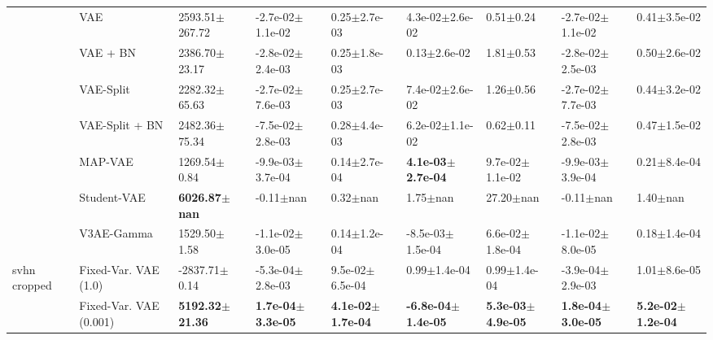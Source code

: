 \begin{tabular}{lllllllll}
             & VAE &          2593.51$\pm$267.72 &          -2.7e-02$\pm$1.1e-02 &              0.25$\pm$2.7e-03 &            4.3e-02$\pm$2.6e-02 &                 0.51$\pm$0.24 &          -2.7e-02$\pm$1.1e-02 &              0.41$\pm$3.5e-02 \\
             & VAE + BN &           2386.70$\pm$23.17 &          -2.8e-02$\pm$2.4e-03 &              0.25$\pm$1.8e-03 &               0.13$\pm$2.6e-02 &                 1.81$\pm$0.53 &          -2.8e-02$\pm$2.5e-03 &              0.50$\pm$2.6e-02 \\
             & VAE-Split &           2282.32$\pm$65.63 &          -2.7e-02$\pm$7.6e-03 &              0.25$\pm$2.7e-03 &            7.4e-02$\pm$2.6e-02 &                 1.26$\pm$0.56 &          -2.7e-02$\pm$7.7e-03 &              0.44$\pm$3.2e-02 \\
             & VAE-Split + BN &           2482.36$\pm$75.34 &          -7.5e-02$\pm$2.8e-03 &              0.28$\pm$4.4e-03 &            6.2e-02$\pm$1.1e-02 &                 0.62$\pm$0.11 &          -7.5e-02$\pm$2.8e-03 &              0.47$\pm$1.5e-02 \\
             & MAP-VAE &            1269.54$\pm$0.84 &          -9.9e-03$\pm$3.7e-04 &              0.14$\pm$2.7e-04 &   \textbf{4.1e-03$\pm$2.7e-04} &           9.7e-02$\pm$1.1e-02 &          -9.9e-03$\pm$3.9e-04 &              0.21$\pm$8.4e-04 \\
             & Student-VAE &    \textbf{6026.87$\pm$nan} &                 -0.11$\pm$nan &                  0.32$\pm$nan &                   1.75$\pm$nan &                 27.20$\pm$nan &                 -0.11$\pm$nan &                  1.40$\pm$nan \\
             & V3AE-Gamma &            1529.50$\pm$1.58 &          -1.1e-02$\pm$3.0e-05 &              0.14$\pm$1.2e-04 &           -8.5e-03$\pm$1.5e-04 &           6.6e-02$\pm$1.8e-04 &          -1.1e-02$\pm$8.0e-05 &              0.18$\pm$1.4e-04 \\
svhn cropped & Fixed-Var. VAE (1.0) &           -2837.71$\pm$0.14 &          -5.3e-04$\pm$2.8e-03 &           9.5e-02$\pm$6.5e-04 &               0.99$\pm$1.4e-04 &              0.99$\pm$1.4e-04 &          -3.9e-04$\pm$2.9e-03 &              1.01$\pm$8.6e-05 \\
             & Fixed-Var. VAE (0.001) &  \textbf{5192.32$\pm$21.36} &  \textbf{1.7e-04$\pm$3.3e-05} &  \textbf{4.1e-02$\pm$1.7e-04} &  \textbf{-6.8e-04$\pm$1.4e-05} &  \textbf{5.3e-03$\pm$4.9e-05} &  \textbf{1.8e-04$\pm$3.0e-05} &  \textbf{5.2e-02$\pm$1.2e-04} \\
\bottomrule
\end{tabular}

